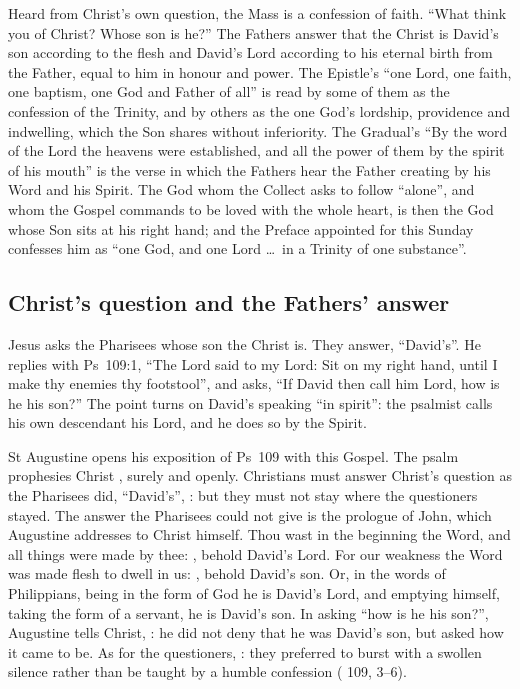 \label{sec:son-and-lord-of-david}

Heard from Christ's own question, the Mass is a confession of faith. ``What
think you of Christ? Whose son is he?'' The Fathers answer that the Christ is
David's son according to the flesh and David's Lord according to his eternal
birth from the Father, equal to him in honour and power. The Epistle's ``one
Lord, one faith, one baptism, one God and Father of all'' is read by some of
them as the confession of the Trinity, and by others as the one God's lordship,
providence and indwelling, which the Son shares without inferiority. The
Gradual's ``By the word of the Lord the heavens were established, and all the
power of them by the spirit of his mouth'' is the verse in which the Fathers
hear the Father creating by his Word and his Spirit. The God whom the Collect
asks to follow ``alone'', and whom the Gospel commands to be loved with the
whole heart, is then the God whose Son sits at his right hand; and the
Preface appointed for this Sunday confesses him as ``one God, and one Lord
\dots\ in a Trinity of one substance''.

\subsection{Christ's question and the Fathers' answer}

Jesus asks the Pharisees whose son the Christ is. They answer, ``David's''.
He replies with Ps~109:1, ``The Lord said to my Lord: Sit on my right hand,
until I make thy enemies thy footstool'', and asks, ``If David then call him
Lord, how is he his son?'' The point turns on David's speaking ``in spirit'':
the psalmist calls his own descendant his Lord, and he does so by the Spirit.

St Augustine opens his exposition of Ps~109 with this Gospel. The psalm
prophesies Christ , surely and openly. Christians must
answer Christ's question as the Pharisees did, ``David's'', : but they must not stay where the questioners stayed.
The answer the Pharisees could not give is the prologue of John, which
Augustine addresses to Christ himself. Thou wast in the beginning the Word,
and all things were made by thee: , behold David's
Lord. For our weakness the Word was made flesh to dwell in us: , behold David's son. Or, in the words of Philippians, being in
the form of God he is David's Lord, and emptying himself, taking the form of a
servant, he is David's son. In asking ``how is he his son?'', Augustine tells
Christ, : he did not deny that he was David's son, but asked how it came to
be. As for the questioners, : they preferred to burst with a swollen
silence rather than be taught by a humble confession ( 109, 3--6).

